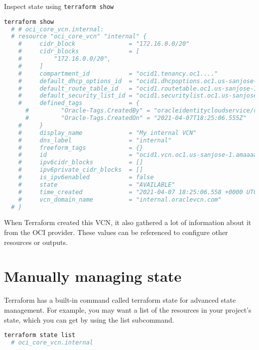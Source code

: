 \documentclass[../main.tex]{subfiles}
\begin{document}
Inspect state using \lstinline{terraform show}
\begin{lstlisting}[language=bash]
  terraform show
  # # oci_core_vcn.internal:
  # resource "oci_core_vcn" "internal" {
    #     cidr_block               = "172.16.0.0/20"
    #     cidr_blocks              = [
    #         "172.16.0.0/20",
    #     ]
    #     compartment_id           = "ocid1.tenancy.oc1...."
    #     default_dhcp_options_id  = "ocid1.dhcpoptions.oc1.us-sanjose-1.aaaaaaaa6odqyurw4mf7jmf3jy6ehtw6n32ohyogy4w5c43qoubgewyxr2va"
    #     default_route_table_id   = "ocid1.routetable.oc1.us-sanjose-1.aaaaaaaan3n6iazjfubarvwwtszl3v6gdzqvfoccdj555p2ujehbo4tlu7ma"
    #     default_security_list_id = "ocid1.securitylist.oc1.us-sanjose-1.aaaaaaaant6vlu2y77pwwzjubmzg6czzvo2laii4h3p5d7w2nqcr4fey5gaa"
    #     defined_tags             = {
      #         "Oracle-Tags.CreatedBy" = "oracleidentitycloudservice/redacted"
      #         "Oracle-Tags.CreatedOn" = "2021-04-07T18:25:06.555Z"
    #     }
    #     display_name             = "My internal VCN"
    #     dns_label                = "internal"
    #     freeform_tags            = {}
    #     id                       = "ocid1.vcn.oc1.us-sanjose-1.amaaaaaapqqlmeyaklull6tpfms534aoijpjwpkzjo25rxqiqhadgdzodnua"
    #     ipv6cidr_blocks          = []
    #     ipv6private_cidr_blocks  = []
    #     is_ipv6enabled           = false
    #     state                    = "AVAILABLE"
    #     time_created             = "2021-04-07 18:25:06.558 +0000 UTC"
    #     vcn_domain_name          = "internal.oraclevcn.com"
  # }
\end{lstlisting}
When Terraform created this \gls{VCN}, it also gathered a lot of information about it from the \gls{OCI} provider. These values can be referenced to configure other resources or outputs.

\section{Manually managing state}
Terraform has a built-in command called terraform state for advanced state management. For example, you may want a list of the resources in your project's state, which you can get by using the list subcommand.

\begin{lstlisting}[language=bash]
  terraform state list
  # oci_core_vcn.internal
\end{lstlisting}


\printglossaries
\end{document}
